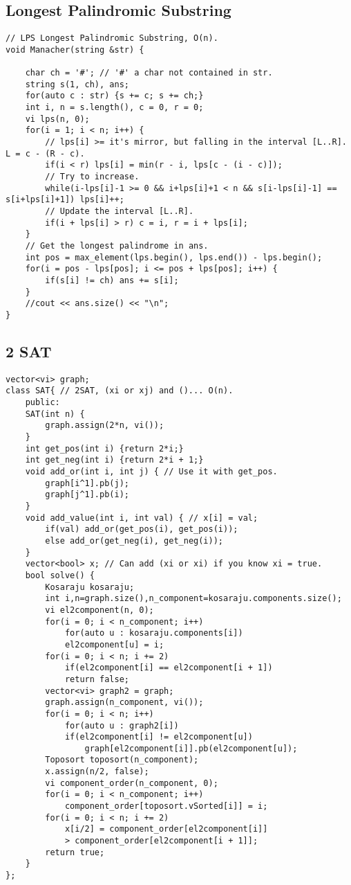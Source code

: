 \documentclass[a4paper]{article}
\begin{document}
\subsection*{Longest Palindromic Substring}
\begin{verbatim}
// LPS Longest Palindromic Substring, O(n).
void Manacher(string &str) {

    char ch = '#'; // '#' a char not contained in str.
    string s(1, ch), ans;
    for(auto c : str) {s += c; s += ch;}
    int i, n = s.length(), c = 0, r = 0;
    vi lps(n, 0);
    for(i = 1; i < n; i++) {
        // lps[i] >= it's mirror, but falling in the interval [L..R]. L = c - (R - c).
        if(i < r) lps[i] = min(r - i, lps[c - (i - c)]);
        // Try to increase.
        while(i-lps[i]-1 >= 0 && i+lps[i]+1 < n && s[i-lps[i]-1] == s[i+lps[i]+1]) lps[i]++;
        // Update the interval [L..R].
        if(i + lps[i] > r) c = i, r = i + lps[i];
    }
    // Get the longest palindrome in ans.
    int pos = max_element(lps.begin(), lps.end()) - lps.begin();
    for(i = pos - lps[pos]; i <= pos + lps[pos]; i++) {
        if(s[i] != ch) ans += s[i];
    }
    //cout << ans.size() << "\n";
}
\end{verbatim}
\subsection*{2 SAT}
\begin{multicols}{2}
\begin{verbatim}
vector<vi> graph;
class SAT{ // 2SAT, (xi or xj) and ()... O(n).
    public:
    SAT(int n) {
        graph.assign(2*n, vi());
    }
    int get_pos(int i) {return 2*i;}
    int get_neg(int i) {return 2*i + 1;}
    void add_or(int i, int j) { // Use it with get_pos.
        graph[i^1].pb(j);
        graph[j^1].pb(i);
    }
    void add_value(int i, int val) { // x[i] = val;
        if(val) add_or(get_pos(i), get_pos(i));
        else add_or(get_neg(i), get_neg(i));
    }
    vector<bool> x; // Can add (xi or xi) if you know xi = true.
    bool solve() {
        Kosaraju kosaraju;
        int i,n=graph.size(),n_component=kosaraju.components.size();
        vi el2component(n, 0);
        for(i = 0; i < n_component; i++)
            for(auto u : kosaraju.components[i])
            el2component[u] = i;
        for(i = 0; i < n; i += 2)
            if(el2component[i] == el2component[i + 1]) 
            return false;
        vector<vi> graph2 = graph;
        graph.assign(n_component, vi());
        for(i = 0; i < n; i++) 
            for(auto u : graph2[i]) 
            if(el2component[i] != el2component[u])
                graph[el2component[i]].pb(el2component[u]);
        Toposort toposort(n_component);
        x.assign(n/2, false);
        vi component_order(n_component, 0);
        for(i = 0; i < n_component; i++)
            component_order[toposort.vSorted[i]] = i;
        for(i = 0; i < n; i += 2)
            x[i/2] = component_order[el2component[i]] 
            > component_order[el2component[i + 1]];
        return true;
    }
};
\end{verbatim}
\end{multicols}
\end{document}
